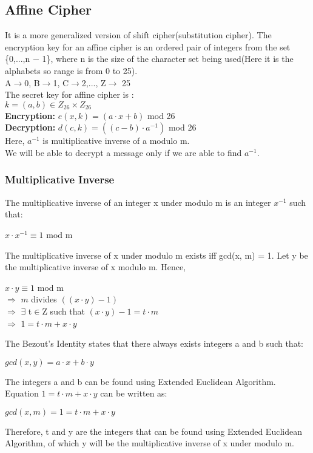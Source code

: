 \documentclass[11pt]{article}
\begin{document}
\subsection{Affine Cipher}
It is a more generalized version of shift cipher(substitution cipher). The encryption key for an affine cipher is an ordered pair of integers from the set \{0,...,n − 1\}, where n is the size of the character set being used(Here it is the alphabets so range is from 0 to 25).\\
A$\rightarrow$0, B$\rightarrow$1, C$\rightarrow$2,..., Z$\rightarrow$ 25\\
The secret key for affine cipher is : \\
$k = (a, b) \in Z_{26} \times Z_{26}$\\
\textbf{Encryption:} $e(x, k) = (a \cdot x + b)$ mod 26\\
\textbf{Decryption:} $d(c, k) = ((c - b)\cdot a^{-1})$ mod 26\\
Here, $a^{-1}$ is multiplicative inverse of a modulo m.\\
We will be able to decrypt a message only if we are able to find $a^{-1}$.\\
\subsubsection{Multiplicative Inverse}
The multiplicative inverse of an integer x under modulo m is an integer $x^{-1}$ such that:
\begin{center}
$x \cdot x^{-1} \equiv 1$ mod m\\
\end{center}
The multiplicative inverse of x under modulo m exists iff gcd(x, m) = 1. Let y be the multiplicative inverse of x modulo m. Hence,
\begin{center}
    $x \cdot y \equiv 1$ mod m\\
    $\Rightarrow$ $m$ divides $ ((x \cdot y) - 1)$  \\
    $\Rightarrow$ $\exists$ t$\in$Z such that $(x \cdot y) - 1 = t\cdot m$ \\
    $\Rightarrow$ $1 = t \cdot m + x \cdot y$  \\
\end{center}
The Bezout's Identity states that there always exists integers a and b such that:
\begin{center}
    $gcd(x,y) = a \cdot x + b \cdot y$
\end{center}
The integers a and b can be found using Extended Euclidean Algorithm.\\
Equation $1 = t \cdot m + x \cdot y$ can be written as:
\begin{center}
    $gcd(x, m) = 1 = t \cdot m + x \cdot y$
\end{center}
Therefore, t and y are the integers that can be found using Extended Euclidean Algorithm, of which y will be the multiplicative inverse of x under modulo m.
\end{document}
